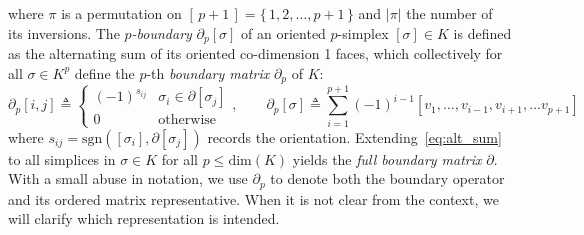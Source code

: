 where $\pi$ is a permutation on $[\,p+1\,] = \{\, 1, 2, \dots, p+1 \, \}$ and $\lvert \pi \rvert$ the number of its inversions. 
The \emph{$p$-boundary} $\partial_p[\sigma]$ of an oriented $p$-simplex $[\sigma] \in K$ is defined as the alternating sum of its oriented co-dimension 1 faces, which collectively for all $\sigma \in K^p$ define the $p$-th \emph{boundary matrix} $\partial_p$ of $K$:
\begin{equation}\label{eq:alt_sum}
	\partial_p[i,j] \triangleq \begin{cases}
		(-1)^{s_{ij}} & \sigma_i \in \partial[\sigma_j]  \\
		0 & \text{otherwise}
	\end{cases},
	\quad \quad  
	\partial_p[\sigma] \triangleq \sum_{i=1}^{p+1} (-1)^{i-1} [v_1, \dots, v_{i-1}, v_{i+1}, \dots v_{p+1}]	
\end{equation}
where $s_{ij} = \mathrm{sgn}([\sigma_i], \partial [\sigma_j])$ records the orientation. Extending~\eqref{eq:alt_sum} to all simplices in $\sigma \in K$ for all $p \leq \mathrm{dim}(K)$ yields the \emph{full boundary matrix} $\partial$. 
With a small abuse in notation, we use $\partial_p$ to denote both the boundary operator and its ordered matrix representative. When it is not clear from the context, we will clarify which representation is intended. 


